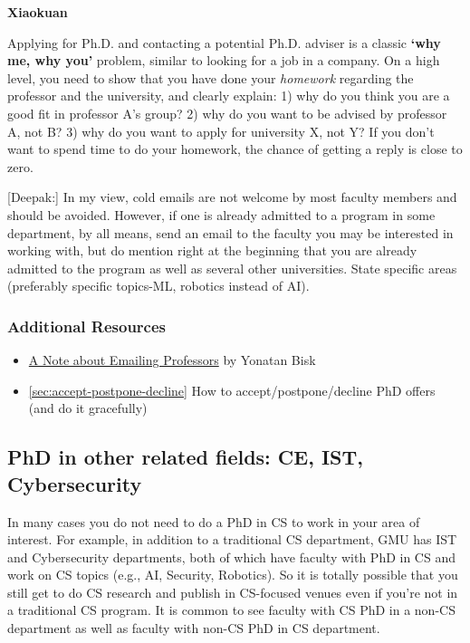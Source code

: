 \documentclass[oneside,11pt]{book}
\newenvironment{commentbox}[1][]{
  \small
  \begin{mybox}
    {\small \textbf{#1}}
  }{
  \end{mybox}
}
\begin{document}
\begin{commentbox}[Xiaokuan]
  Applying for Ph.D. and contacting a potential Ph.D. adviser is a classic \textbf{`why me, why you'} problem,
  similar to looking for a job in a company.
  On a high level,
  you need to show that you have done your \emph{homework}
  regarding the professor and the university,
  and clearly explain:
  1) why do you think you are a good fit in professor A's group?
  2) why do you want to be advised by professor A, not B?
  3) why do you want to apply for university X, not Y?
  If you don't want to spend time to do your homework,
  the chance of getting a reply is close to zero.
\end{commentbox}


\begin{commentbox}
  [Deepak:]
  In my view, cold emails are not welcome by most faculty members and should be avoided. However, if one is already admitted to a program in some department, by all means, send an email to the faculty you may be interested in working with, but do mention right at the beginning that you are already admitted to the program as well as several other universities. State specific areas (preferably specific topics-ML, robotics instead of AI).
\end{commentbox}

\subsubsection*{Additional Resources}
\begin{itemize}
  \item \href{https://yonatanbisk.com/emailing_professors.html}{A Note about Emailing Professors} by Yonatan Bisk
  \item \autoref{sec:accept-postpone-decline} How to accept/postpone/decline PhD offers (and do it gracefully)
\end{itemize}

\subsection{PhD in other related fields: CE, IST, Cybersecurity}\label{sec:related-fields}

In many cases you do not need to do a PhD in CS to work in your area of interest. For example, in addition to a traditional CS department, GMU has IST and Cybersecurity departments, both of which have faculty  with PhD in CS and work on CS topics (e.g., AI, Security, Robotics).  So it is totally possible that you still get to do CS research and publish in CS-focused venues even if you're not in a traditional CS program.  It is  common to see faculty with CS PhD in a non-CS department as well as faculty with non-CS PhD in CS department.  
\end{document}
